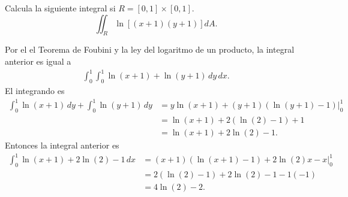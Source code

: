 Calcula la siguiente integral si \(R =  [0,1]\times [ 0,1 ] \).
\[
    \iint_R\ln \left[ ( x+1 ) ( y+1 ) \right] dA.
\]
\begin{solution}
    Por el el Teorema de Foubini y la ley del logaritmo de un producto, 
    la integral anterior es igual a 
    \begin{align*}
        \int_{0}^1
        \int_0^1
        \ln(x+1)
        +\ln(y+1)
        \,dy
        \,dx.
    \end{align*}
    El integrando es 
    \begin{align*}
        \int_0^1\ln(x+1)\,dy+\int_0^1\ln(y+1)\,dy 
        &=
        y \left.
        \ln(x+1)+(y+1)(\ln(y+1)-1)\right
        \rvert_0^1\\
        &=
        \ln(x+1)
        +
        2(\ln(2)-1)
        +1\\
        &=
        \ln(x+1)
        +
        2\ln(2)
        -1.
    \end{align*}
    Entonces la integral anterior es
    \begin{align*}
        \int_0^1
        \ln(x+1)
        +2\ln(2)
        -1
        \, dx
        &=
        (x+1)(\ln(x+1)-1)
        +2\ln(2)x
        -x\rvert_0^1\\
        &=
        2(\ln(2)-1)
        +2\ln(2)-1
        -1(-1)\\
        &=
        4\ln(2)-2.
    \end{align*}
\end{solution}


